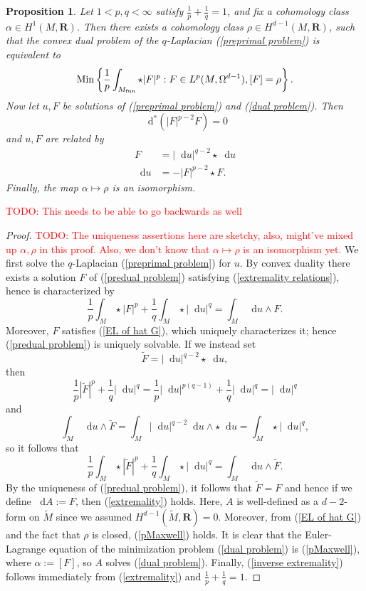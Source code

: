 \documentclass[reqno,11pt]{amsart}
\newcommand{\RR}{\mathbf{R}}
\newcommand*\dif{\mathop{}\!\mathrm{d}}
\newcommand{\Min}{\mathrm{Min}}
\newtheorem{proposition}[theorem]{Proposition}
\theoremstyle{definition}
\numberwithin{equation}{section}
\newcommand\todo[1]{\textcolor{red}{TODO: #1}}
\begin{document}
\begin{proposition}\label{convex duality}
Let $1 < p, q < \infty$ satisfy $\frac{1}{p} + \frac{1}{q} = 1$, and fix a cohomology class $\alpha \in H^1(M, \RR)$.
Then there exists a cohomology class $\rho \in H^{d - 1}(M, \RR)$, such that the convex dual problem of the $q$-Laplacian (\ref{preprimal problem}) is equivalent to 
\begin{equation}\label{dual problem}
\Min\left\{\frac{1}{p} \int_{M_{\rm fun}} \star |F|^p: F \in L^p(M, \Omega^{d - 1}), [F] = \rho\right\}.
\end{equation}
Now let $u, F$ be solutions of (\ref{preprimal problem}) and (\ref{dual problem}). Then
\begin{equation}\label{pMaxwell}
\dif^*(|F|^{p - 2} F) = 0
\end{equation}
and $u, F$ are related by
\begin{align}
F &= |\dif u|^{q - 2} \star \dif u \label{extremality} \\
\dif u &= -|F|^{p - 2} \star F. \label{inverse extremality}
\end{align}
Finally, the map $\alpha \mapsto \rho$ is an isomorphism.
\end{proposition}
\todo{This needs to be able to go backwards as well}
\begin{proof}
\todo{The uniqueness assertions here are sketchy, also, might've mixed up $\alpha, \rho$ in this proof. Also, we don't know that $\alpha \mapsto \rho$ is an isomorphism yet.}
We first solve the $q$-Laplacian (\ref{preprimal problem}) for $u$.
By convex duality \cite[Chapter III, Theorem 4.2]{Ekeland99} there exists a solution $F$ of (\ref{predual problem}) satisfying (\ref{extremality relations}), hence is characterized by 
$$\frac{1}{p} \int_M \star |F|^p + \frac{1}{q} \int_M \star |\dif u|^q = \int_M \dif u \wedge F.$$
Moreover, $F$ satisfies (\ref{EL of hat G}), which uniquely characterizes it; hence (\ref{predual problem}) is uniquely solvable.
If we instead set
$$\tilde F = |\dif u|^{q - 2} \star \dif u,$$
then 
$$\frac{1}{p} |\tilde F|^p + \frac{1}{q} |\dif u|^q = \frac{1}{p} |\dif u|^{p(q - 1)} + \frac{1}{q} |\dif u|^q = |\dif u|^q$$
and 
$$\int_M \dif u \wedge \tilde F = \int_M |\dif u|^{q - 2} \dif u \wedge \star \dif u = \int_M \star |\dif u|^q,$$
so it follows that 
$$\frac{1}{p} \int_M \star |\tilde F|^p + \frac{1}{q} \int_M \star |\dif u|^q = \int_M \dif u \wedge \tilde F.$$
By the uniqueness of (\ref{predual problem}), it follows that $\tilde F = F$ and hence if we define $\dif A := F$, then (\ref{extremality}) holds.
Here, $A$ is well-defined as a $d-2$-form on $\tilde M$ since we assumed $H^{d - 1}(\tilde M, \RR) = $0.
Moreover, from (\ref{EL of hat G}) and the fact that $\rho$ is closed, (\ref{pMaxwell}) holds.
It is clear that the Euler-Lagrange equation of the minimization problem (\ref{dual problem}) is (\ref{pMaxwell}), where $\alpha := [F]$, so $A$ solves (\ref{dual problem}).
Finally, (\ref{inverse extremality}) follows immediately from (\ref{extremality}) and $\frac{1}{p} + \frac{1}{q} = 1$.
\end{proof}
\end{document}

